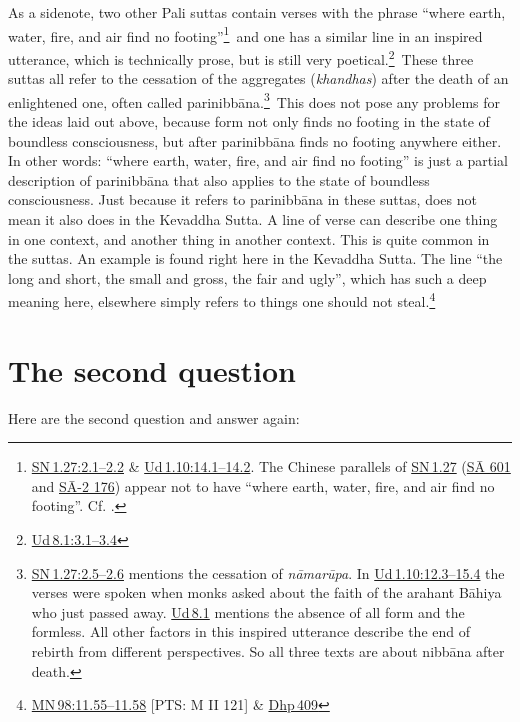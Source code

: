 \documentclass[10pt, openright]{book}
\begin{document}
As a sidenote, two other Pali suttas contain verses with the phrase “where earth, water, fire, and air find no footing”\footnote {\href{https://suttacentral.net/sn1.27/en/sujato\#2.1}{SN 1.27:2.1–2.2} \& \href{https://suttacentral.net/ud1.10/en/sujato\#14.1}{Ud 1.10:14.1–14.2}. The Chinese parallels of \href{https://suttacentral.net/sn1.27/en/sujato}{SN 1.27} (\href{https://suttacentral.net/sa601}{SĀ 601} and \href{https://suttacentral.net/sa-2.176}{SĀ-2 176}) appear not to have “where earth, water, fire, and air find no footing”. Cf. \cite{Sujato 2011b}.} and one has a similar line in an inspired utterance, which is technically prose, but is still very poetical.\footnote {\href{https://suttacentral.net/ud8.1/en/sujato\#3.1}{Ud 8.1:3.1–3.4}} These three suttas all refer to the cessation of the aggregates (\textit{khandhas}) after the death of an enlightened one, often called parinibbāna.\footnote {\href{https://suttacentral.net/sn1.27/en/sujato\#2.5}{SN 1.27:2.5–2.6} mentions the cessation of \textit{nāmarūpa}. In \href{https://suttacentral.net/ud1.10/en/sujato\#12.3}{Ud 1.10:12.3–15.4} the verses were spoken when monks asked about the faith of the arahant Bāhiya who just passed away. \href{https://suttacentral.net/ud8.1/en/sujato}{Ud 8.1} mentions the absence of all form and the formless. All other factors in this inspired utterance describe the end of rebirth from different perspectives. So all three texts are about nibbāna after death.} This does not pose any problems for the ideas laid out above, because form not only finds no footing in the state of boundless consciousness, but after parinibbāna finds no footing anywhere either. In other words: “where earth, water, fire, and air find no footing” is just a partial description of parinibbāna that also applies to the state of boundless consciousness. Just because it refers to parinibbāna in these suttas, does not mean it also does in the Kevaddha Sutta. A line of verse can describe one thing in one context, and another thing in another context. This is quite common in the suttas. An example is found right here in the Kevaddha Sutta. The line “the long and short, the small and gross, the fair and ugly”, which has such a deep meaning here, elsewhere simply refers to things one should not steal.\footnote {\href{https://suttacentral.net/mn98/en/sujato\#11.55}{MN 98:11.55–11.58} [PTS: M II 121] \& \href{https://suttacentral.net/dhp409/en/sujato}{Dhp 409}}




\section{The second question}
Here are the second question and answer again:
\end{document}
